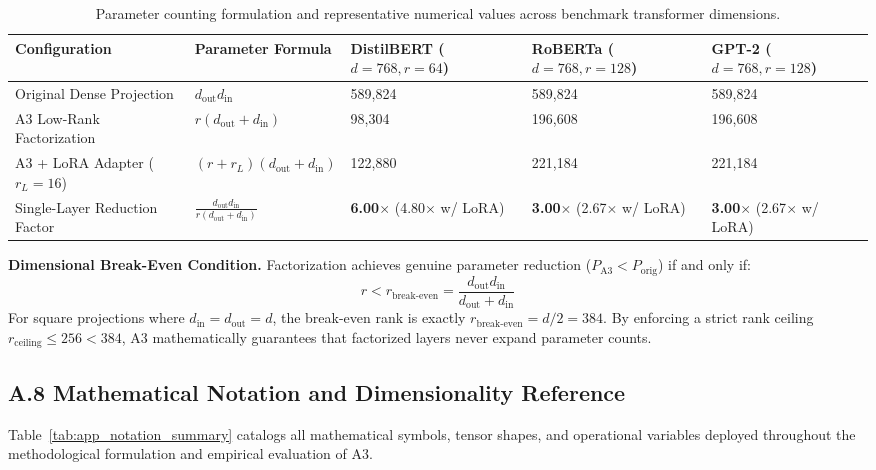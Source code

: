 \begin{table}[H]
\centering
\small
\begin{tabular}{lllll}
\toprule
\textbf{Configuration} & \textbf{Parameter Formula} & \textbf{DistilBERT ($d=768, r=64$)} & \textbf{RoBERTa ($d=768, r=128$)} & \textbf{GPT-2 ($d=768, r=128$)} \\
\midrule
Original Dense Projection & $d_\text{out} d_\text{in}$ & 589,824 & 589,824 & 589,824 \\
A3 Low-Rank Factorization & $r(d_\text{out} + d_\text{in})$ & 98,304 & 196,608 & 196,608 \\
A3 + LoRA Adapter ($r_L=16$) & $(r + r_L)(d_\text{out} + d_\text{in})$ & 122,880 & 221,184 & 221,184 \\
Single-Layer Reduction Factor & $\frac{d_\text{out} d_\text{in}}{r(d_\text{out} + d_\text{in})}$ & \textbf{6.00$\times$} (4.80$\times$ w/ LoRA) & \textbf{3.00$\times$} (2.67$\times$ w/ LoRA) & \textbf{3.00$\times$} (2.67$\times$ w/ LoRA) \\
\bottomrule
\end{tabular}
\caption{Parameter counting formulation and representative numerical values across benchmark transformer dimensions.}
\label{tab:parameter_counting_formulation}
\end{table}

\textbf{Dimensional Break-Even Condition.} Factorization achieves genuine parameter reduction ($P_\text{A3} < P_\text{orig}$) if and only if:
\begin{equation}
r < r_\text{break-even} = \frac{d_\text{out} d_\text{in}}{d_\text{out} + d_\text{in}}
\tag{A.16}
\end{equation}
For square projections where $d_\text{in} = d_\text{out} = d$, the break-even rank is exactly $r_\text{break-even} = d/2 = 384$. By enforcing a strict rank ceiling $r_{\mathrm{ceiling}} \le 256 < 384$, A3 mathematically guarantees that factorized layers never expand parameter counts.

\subsection{A.8 Mathematical Notation and Dimensionality Reference}
\label{sec:app_notation}

Table~\ref{tab:app_notation_summary} catalogs all mathematical symbols, tensor shapes, and operational variables deployed throughout the methodological formulation and empirical evaluation of A3.

